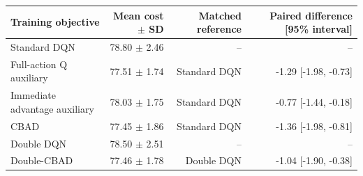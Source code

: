 \begin{tabular}{lrrr}
\toprule
Training objective & Mean cost $\pm$ SD & Matched reference & Paired difference [95\% interval] \\
\midrule
Standard DQN & 78.80 $\pm$ 2.46 & -- & -- \\
Full-action Q auxiliary & 77.51 $\pm$ 1.74 & Standard DQN & -1.29 [-1.98, -0.73] \\
Immediate advantage auxiliary & 78.03 $\pm$ 1.75 & Standard DQN & -0.77 [-1.44, -0.18] \\
CBAD & 77.45 $\pm$ 1.86 & Standard DQN & -1.36 [-1.98, -0.81] \\
Double DQN & 78.50 $\pm$ 2.51 & -- & -- \\
Double-CBAD & 77.46 $\pm$ 1.78 & Double DQN & -1.04 [-1.90, -0.38] \\
\bottomrule
\end{tabular}
